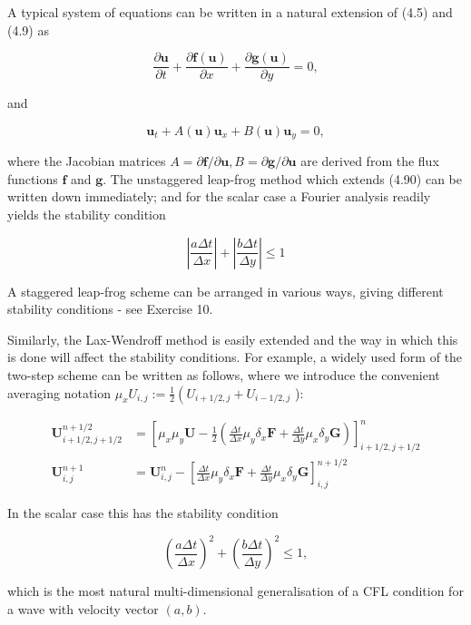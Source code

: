 \documentclass[10pt]{article}
\begin{document}
A typical system of equations can be written in a natural extension of (4.5) and (4.9) as

\[
\frac{\partial \boldsymbol{u}}{\partial t}+\frac{\partial \boldsymbol{f}(\boldsymbol{u})}{\partial x}+\frac{\partial \boldsymbol{g}(\boldsymbol{u})}{\partial y}=0,
\]

and

\[
\boldsymbol{u}_{t}+A(\boldsymbol{u}) \boldsymbol{u}_{x}+B(\boldsymbol{u}) \boldsymbol{u}_{y}=0,
\]

where the Jacobian matrices \(A=\partial \boldsymbol{f} / \partial \boldsymbol{u}, B=\partial \boldsymbol{g} / \partial \boldsymbol{u}\) are derived from the flux functions \(\boldsymbol{f}\) and \(\boldsymbol{g}\). The unstaggered leap-frog method which extends (4.90) can be written down immediately; and for the scalar case a Fourier analysis readily yields the stability condition

\[
\left|\frac{a \Delta t}{\Delta x}\right|+\left|\frac{b \Delta t}{\Delta y}\right| \leq 1
\]

A staggered leap-frog scheme can be arranged in various ways, giving different stability conditions - see Exercise 10.

Similarly, the Lax-Wendroff method is easily extended and the way in which this is done will affect the stability conditions. For example, a widely used form of the two-step scheme can be written as follows, where we introduce the convenient averaging notation \(\mu_{x} U_{i, j}:=\frac{1}{2}\left(U_{i+1 / 2, j}+\right. U_{i-1 / 2, j}\) ):

\[
\begin{aligned}
\boldsymbol{U}_{i+1 / 2, j+1 / 2}^{n+1 / 2} & =\left[\mu_{x} \mu_{y} \boldsymbol{U}-\frac{1}{2}\left(\frac{\Delta t}{\Delta x} \mu_{y} \delta_{x} \boldsymbol{F}+\frac{\Delta t}{\Delta y} \mu_{x} \delta_{y} \boldsymbol{G}\right)\right]_{i+1 / 2, j+1 / 2}^{n} \\
\boldsymbol{U}_{i, j}^{n+1} & =\boldsymbol{U}_{i, j}^{n}-\left[\frac{\Delta t}{\Delta x} \mu_{y} \delta_{x} \boldsymbol{F}+\frac{\Delta t}{\Delta y} \mu_{x} \delta_{y} \boldsymbol{G}\right]_{i, j}^{n+1 / 2}
\end{aligned}
\]

In the scalar case this has the stability condition

\[
\left(\frac{a \Delta t}{\Delta x}\right)^{2}+\left(\frac{b \Delta t}{\Delta y}\right)^{2} \leq 1,
\]

which is the most natural multi-dimensional generalisation of a CFL condition for a wave with velocity vector \((a, b)\).
\end{document}
